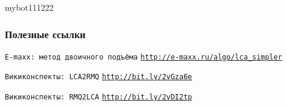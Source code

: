 mybot111222\documentclass[10pt]{beamer}
\begin{document}
\appendix

\begin{frame}[allowframebreaks]
  \frametitle<presentation>{Полезные ссылки}
    
  \begin{thebibliography}{10}
{
  \beamertemplatebookbibitems

  \texttt{E-maxx: метод двоичного подъёма}
  \newblock \href{http://e-maxx.ru/algo/lca\_simpler}
  {\texttt{http://e-maxx.ru/algo/lca\_simpler}}
  
  \texttt{Викиконспекты: LCA2RMQ}
  \newblock \href{http://bit.ly/2vGza6e}
  {\texttt{http://bit.ly/2vGza6e}}
  
  \texttt{Викиконспекты: RMQ2LCA}
  \newblock \href{http://bit.ly/2vDI2tp}
  {\texttt{http://bit.ly/2vDI2tp}}
}
  \end{thebibliography}
  \end{frame}
\end{document}
